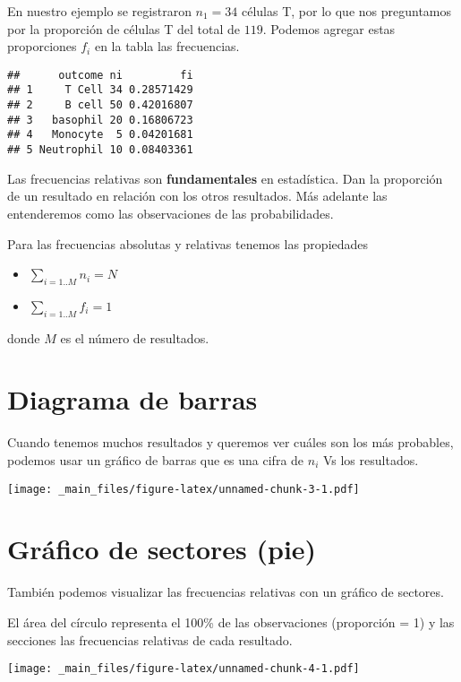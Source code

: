 \documentclass[
]{book}
\providecommand{\tightlist}{%
  \setlength{\itemsep}{0pt}\setlength{\parskip}{0pt}}
\begin{document}
En nuestro ejemplo se registraron \(n_1=34\) células T, por lo que nos preguntamos por la proporción de células T del total de \(119\). Podemos agregar estas proporciones \(f_i\) en la tabla las frecuencias.

\begin{verbatim}
##      outcome ni         fi
## 1     T Cell 34 0.28571429
## 2     B cell 50 0.42016807
## 3   basophil 20 0.16806723
## 4   Monocyte  5 0.04201681
## 5 Neutrophil 10 0.08403361
\end{verbatim}

Las frecuencias relativas son \textbf{fundamentales} en estadística. Dan la proporción de un resultado en relación con los otros resultados. Más adelante las entenderemos como las observaciones de las probabilidades.

Para las frecuencias absolutas y relativas tenemos las propiedades

\begin{itemize}
\tightlist
\item
  \(\sum_{i=1..M} n_i = N\)
\item
  \(\sum_{i=1..M} f_i = 1\)
\end{itemize}

donde \(M\) es el número de resultados.

\hypertarget{diagrama-de-barras}{%
\section{Diagrama de barras}\label{diagrama-de-barras}}

Cuando tenemos muchos resultados y queremos ver cuáles son los más probables, podemos usar un gráfico de barras que es una cifra de \(n_i\) Vs los resultados.

\texttt{[image: \_main\_files/figure-latex/unnamed-chunk-3-1.pdf]}

\hypertarget{gruxe1fico-de-sectores-pie}{%
\section{Gráfico de sectores (pie)}\label{gruxe1fico-de-sectores-pie}}

También podemos visualizar las frecuencias relativas con un gráfico de sectores.

El área del círculo representa el 100\% de las observaciones (proporción = 1) y las secciones las frecuencias relativas de cada resultado.

\texttt{[image: \_main\_files/figure-latex/unnamed-chunk-4-1.pdf]}
\end{document}
